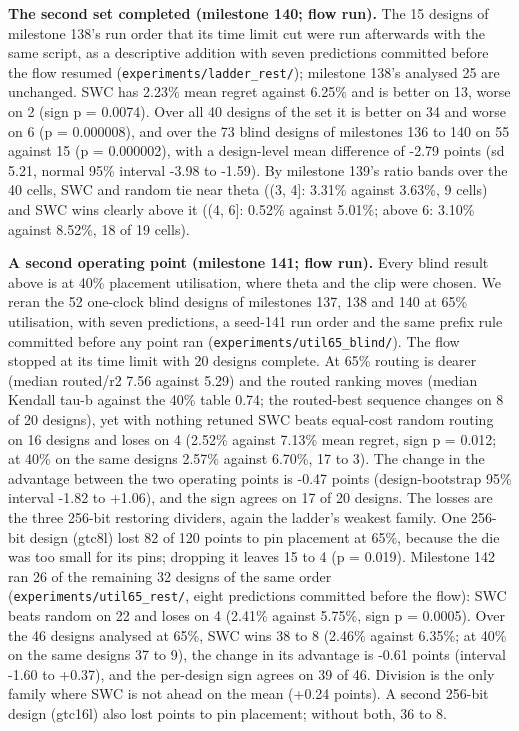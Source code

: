 \documentclass[conference]{IEEEtran}
\begin{document}
\textbf{The second set completed (milestone 140; flow run).} The 15
designs of milestone 138's run order that its time limit cut were run
afterwards with the same script, as a descriptive addition with seven
predictions committed before the flow resumed
(\texttt{experiments/\allowbreak{}ladder\_\allowbreak{}rest/\allowbreak{}}); milestone 138's analysed 25 are
unchanged. SWC has 2.23\% mean regret against 6.25\% and is better on
13, worse on 2 (sign p = 0.0074). Over all 40 designs of the set it is
better on 34 and worse on 6 (p = 0.000008), and over the 73 blind
designs of milestones 136 to 140 on 55 against 15 (p = 0.000002), with a
design-level mean difference of -2.79 points (sd 5.21, normal 95\%
interval -3.98 to -1.59). By milestone 139's ratio bands over the 40
cells, SWC and random tie near theta ((3, 4{]}: 3.31\% against 3.63\%, 9
cells) and SWC wins clearly above it ((4, 6{]}: 0.52\% against 5.01\%;
above 6: 3.10\% against 8.52\%, 18 of 19 cells).

\textbf{A second operating point (milestone 141; flow run).} Every blind
result above is at 40\% placement utilisation, where theta and the clip
were chosen. We reran the 52 one-clock blind designs of milestones 137,
138 and 140 at 65\% utilisation, with seven predictions, a seed-141 run
order and the same prefix rule committed before any point ran
(\texttt{experiments/\allowbreak{}util65\_\allowbreak{}blind/\allowbreak{}}). The flow stopped at its time
limit with 20 designs complete. At 65\% routing is dearer (median
routed/r2 7.56 against 5.29) and the routed ranking moves (median
Kendall tau-b against the 40\% table 0.74; the routed-best sequence
changes on 8 of 20 designs), yet with nothing retuned SWC beats
equal-cost random routing on 16 designs and loses on 4 (2.52\% against
7.13\% mean regret, sign p = 0.012; at 40\% on the same designs 2.57\%
against 6.70\%, 17 to 3). The change in the advantage between the two
operating points is -0.47 points (design-bootstrap 95\% interval -1.82
to +1.06), and the sign agrees on 17 of 20 designs. The losses are the
three 256-bit restoring dividers, again the ladder's weakest family. One
256-bit design (gtc8l) lost 82 of 120 points to pin placement at 65\%,
because the die was too small for its pins; dropping it leaves 15 to 4
(p = 0.019). Milestone 142 ran 26 of the remaining 32 designs of the
same order (\texttt{experiments/\allowbreak{}util65\_\allowbreak{}rest/\allowbreak{}}, eight predictions
committed before the flow): SWC beats random on 22 and loses on 4
(2.41\% against 5.75\%, sign p = 0.0005). Over the 46 designs analysed
at 65\%, SWC wins 38 to 8 (2.46\% against 6.35\%; at 40\% on the same
designs 37 to 9), the change in its advantage is -0.61 points (interval
-1.60 to +0.37), and the per-design sign agrees on 39 of 46. Division is
the only family where SWC is not ahead on the mean (+0.24 points). A
second 256-bit design (gtc16l) also lost points to pin placement;
without both, 36 to 8.
\end{document}
